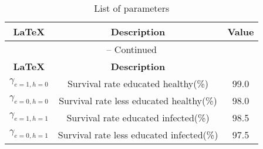 \begin{center}
\begin{longtable}{ccc}
\caption{List of parameters}\\%
\hline%
\multicolumn{1}{c}{\textbf{\LaTeX}} &
\multicolumn{1}{c}{\textbf{Description}} &
\multicolumn{1}{c}{\textbf{Value}}\\%
\hline\hline%
\endfirsthead
\multicolumn{3}{c}{{\tablename} \thetable{} -- Continued}\\%
\hline%
\multicolumn{1}{c}{\textbf{\LaTeX}} &
\multicolumn{1}{c}{\textbf{Description}}\\%
\hline\hline%
\endhead

${\gamma_{e=1,h=0}}$ & Survival rate educated healthy(\%) & 99.0\\
${\gamma_{e=0,h=0}}$ & Survival rate less educated healthy(\%) & 98.0\\
${\gamma_{e=1,h=1}}$ & Survival rate educated infected(\%) & 98.5\\
${\gamma_{e=0,h=1}}$ & Survival rate less educated infected(\%) & 97.5\\


\hline%
\end{longtable}
\end{center}